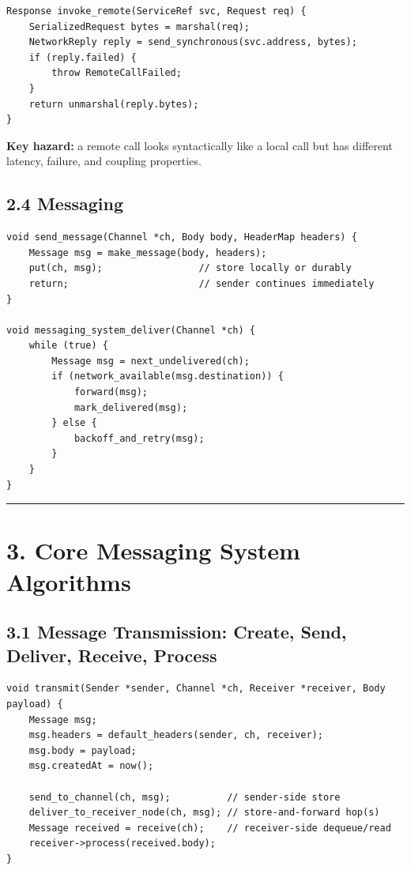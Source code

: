 \documentclass[11pt]{article}
\begin{document}
\begin{verbatim}
Response invoke_remote(ServiceRef svc, Request req) {
    SerializedRequest bytes = marshal(req);
    NetworkReply reply = send_synchronous(svc.address, bytes);
    if (reply.failed) {
        throw RemoteCallFailed;
    }
    return unmarshal(reply.bytes);
}
\end{verbatim}

\textbf{Key hazard:} a remote call looks syntactically like a local call
but has different latency, failure, and coupling properties.

\subsection{2.4 Messaging}\label{messaging}

\begin{verbatim}
void send_message(Channel *ch, Body body, HeaderMap headers) {
    Message msg = make_message(body, headers);
    put(ch, msg);                 // store locally or durably
    return;                       // sender continues immediately
}

void messaging_system_deliver(Channel *ch) {
    while (true) {
        Message msg = next_undelivered(ch);
        if (network_available(msg.destination)) {
            forward(msg);
            mark_delivered(msg);
        } else {
            backoff_and_retry(msg);
        }
    }
}
\end{verbatim}

\begin{center}\rule{0.5\linewidth}{0.5pt}\end{center}

\section{3. Core Messaging System
Algorithms}\label{core-messaging-system-algorithms}

\subsection{3.1 Message Transmission: Create, Send, Deliver, Receive,
Process}\label{message-transmission-create-send-deliver-receive-process}

\begin{verbatim}
void transmit(Sender *sender, Channel *ch, Receiver *receiver, Body payload) {
    Message msg;
    msg.headers = default_headers(sender, ch, receiver);
    msg.body = payload;
    msg.createdAt = now();

    send_to_channel(ch, msg);          // sender-side store
    deliver_to_receiver_node(ch, msg); // store-and-forward hop(s)
    Message received = receive(ch);    // receiver-side dequeue/read
    receiver->process(received.body);
}
\end{verbatim}
\end{document}
